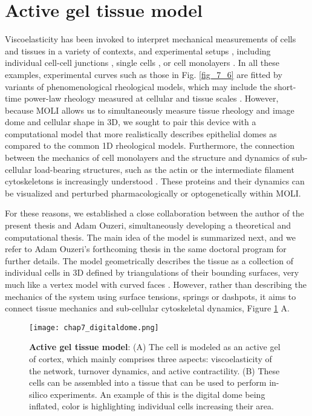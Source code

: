 
\hypertarget{active-gel-tissue-model}{%
	\section{Active gel tissue model}\label{active-gel-tissue-model}}


Viscoelasticity has been invoked to interpret mechanical measurements of cells and tissues in a variety of contexts, and experimental setups \cite{PULLARKAT200729}, including individual cell-cell junctions \cite{clement2017}, single cells \cite{PhysRevLett.94.098103,Fischer-Friedrich:2016aa}, or cell monolayers \cite{Fernandez_2007,khalilgharibi2019}. In all these examples, experimental curves such as those in Fig. \ref{fig_7_6} are fitted by variants of phenomenological rheological models, which may include the short-time power-law rheology measured at cellular and tissue scales   \cite{PULLARKAT200729,doi:10.1098/rsos.190920,khalilgharibi2019}. However, because MOLI allows us to simultaneously measure tissue rheology and image dome and cellular shape in 3D, we sought to pair this device with a computational model that more realistically describes epithelial domes as compared to the common 1D rheological models. Furthermore, the connection between the mechanics of cell monolayers and the structure and dynamics of sub-cellular load-bearing structures, such as the actin or the intermediate filament cytoskeletons is increasingly understood \cite{latorre2018,khalilgharibi2019,duque2023}. These proteins and their dynamics can be visualized and perturbed pharmacologically or optogenetically within MOLI.

For these reasons, we established a close collaboration between the author of the present thesis and Adam Ouzeri, simultaneously developing a theoretical and computational thesis. The main idea of the model is summarized next, and we refer to Adam Ouzeri's forthcoming thesis in the same doctoral program for further details. The model geometrically describes the tissue as a collection of individual cells in 3D defined by triangulations of their bounding surfaces, very much like a vertex model with curved faces \cite{alt2017,perez-gonzalez2021}. However, rather than describing the mechanics of the system using surface tensions, springs or dashpots, it aims to connect tissue mechanics and sub-cellular cytoskeletal dynamics, Figure \ref{fig_7_2} A. 

\begin{figure}
	\centering
	\texttt{[image: chap7\_digitaldome.png]}
	\caption{\label{fig_7_2} \textbf{Active gel tissue model}: (A) The cell is modeled as an active gel of cortex, which mainly comprises three aspects: viscoelasticity of the network, turnover dynamics, and active contractility. (B) These cells can be assembled into a tissue that can be used to perform in-silico experiments. An example of this is the digital dome being inflated, color is highlighting individual cells increasing their area.}
\end{figure}


